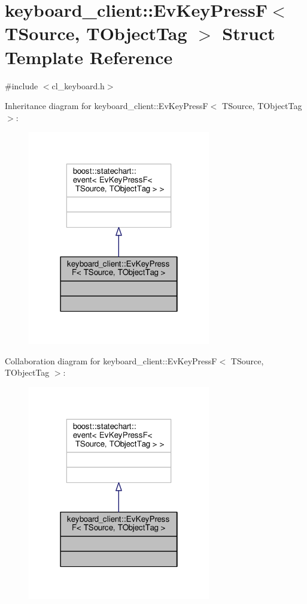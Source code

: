 \hypertarget{structkeyboard__client_1_1EvKeyPressF}{}\section{keyboard\+\_\+client\+:\+:Ev\+Key\+PressF$<$ T\+Source, T\+Object\+Tag $>$ Struct Template Reference}
\label{structkeyboard__client_1_1EvKeyPressF}


{\ttfamily \#include $<$cl\+\_\+keyboard.\+h$>$}



Inheritance diagram for keyboard\+\_\+client\+:\+:Ev\+Key\+PressF$<$ T\+Source, T\+Object\+Tag $>$\+:\nopagebreak
\begin{figure}[H]
\begin{center}
\leavevmode
\includegraphics[width=226pt]{structkeyboard__client_1_1EvKeyPressF__inherit__graph}
\end{center}
\end{figure}


Collaboration diagram for keyboard\+\_\+client\+:\+:Ev\+Key\+PressF$<$ T\+Source, T\+Object\+Tag $>$\+:\nopagebreak
\begin{figure}[H]
\begin{center}
\leavevmode
\includegraphics[width=226pt]{structkeyboard__client_1_1EvKeyPressF__coll__graph}
\end{center}
\end{figure}


